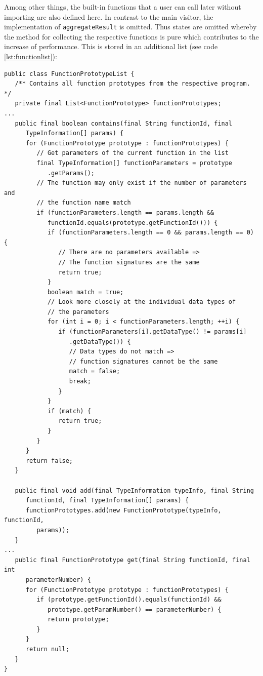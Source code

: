 Among other things, the built-in functions that a user can call later without importing are also defined here. In contrast to the main visitor, the implementation of \texttt{aggregateResult} is omitted. Thus states are omitted whereby the method for collecting the respective functions is pure which contributes to the increase of performance. This is stored in an additional list (see code \ref{lst:functionlist}):

\begin{lstlisting}[frame=htrbl, caption={Implementation of {\ttfamily FunctionPrototypeList.java}}, label={lst:functionlist}, basicstyle=\footnotesize]
public class FunctionPrototypeList {
   /** Contains all function prototypes from the respective program. */
   private final List<FunctionPrototype> functionPrototypes;
...
   public final boolean contains(final String functionId, final 
      TypeInformation[] params) {
      for (FunctionPrototype prototype : functionPrototypes) {
         // Get parameters of the current function in the list
         final TypeInformation[] functionParameters = prototype
            .getParams();
         // The function may only exist if the number of parameters and 
         // the function name match
         if (functionParameters.length == params.length &&  
            functionId.equals(prototype.getFunctionId())) {
            if (functionParameters.length == 0 && params.length == 0) {
               // There are no parameters available => 
               // The function signatures are the same
               return true;
            }
            boolean match = true;
            // Look more closely at the individual data types of 
            // the parameters
            for (int i = 0; i < functionParameters.length; ++i) {
               if (functionParameters[i].getDataType() != params[i]
                  .getDataType()) {
                  // Data types do not match => 
                  // function signatures cannot be the same
                  match = false;
                  break;
               }
            }
            if (match) {
               return true;
            }
         }
      }
      return false;
   }

   public final void add(final TypeInformation typeInfo, final String 
      functionId, final TypeInformation[] params) {
      functionPrototypes.add(new FunctionPrototype(typeInfo, functionId, 
         params));
   }
...
   public final FunctionPrototype get(final String functionId, final int 
      parameterNumber) {
      for (FunctionPrototype prototype : functionPrototypes) {
         if (prototype.getFunctionId().equals(functionId) && 
            prototype.getParamNumber() == parameterNumber) {
            return prototype;
         }
      }
      return null;
   }
}
\end{lstlisting}


